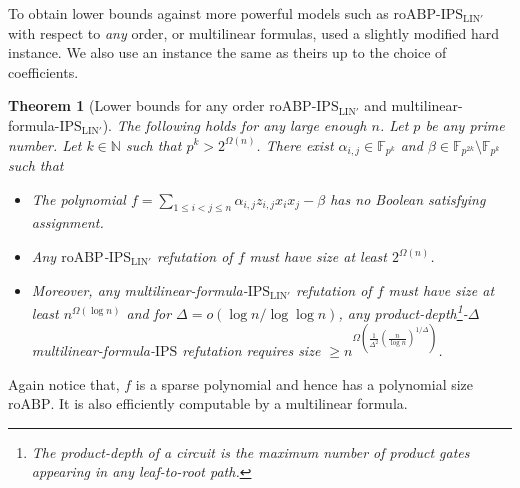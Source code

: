 \documentclass[11pt]{article}
\newtheorem{theorem}{Theorem}[section]
\newcommand{\F}{\mathbb{F}}
\newcommand{\comment}[2]{\marginpar{\tiny{\textbf{#1: }\textit{#2}}}}
\newcommand{\nl}[1]{\comment{NL}{#1}}
\newcommand{\vr}[1]{\comment{VR}{#1}}
\newcommand{\IPS}{\mathrm{IPS}}
\newcommand{\IPSLINp}{\mathrm{IPS}_{\mathrm{LIN}'}}
\newcommand{\roABP}{\mathrm{roABP}}
\begin{document}
To obtain lower bounds against more powerful models such as $\roABP$-$\IPSLINp$ with respect to \emph{any} order, or multilinear formulas, \cite{FSTW21} used a slightly modified hard instance. We also use an instance the same as theirs up to the choice of coefficients. 

\begin{theorem}
[Lower bounds for any order roABP-$\IPSLINp$ and multilinear-formula-$\IPSLINp$]
    \label{thm:lbd-roabp}
    The following holds for any large enough $n$. Let $p$ be any prime number. Let $k \in \mathbb{N}$ such that $p^k > 2^{\Omega(n)}$. There exist $\alpha_{i,j}\in \F_{p^k}$ and $\beta \in \F_{p^{2k}}\setminus \F_{p^k}$ such that 
    \begin{itemize}
        \item The polynomial $f = \sum_{1\leq i < j\leq n}\alpha_{i,j} z_{i,j} x_i x_j - \beta$ has no Boolean satisfying assignment.
        \item Any $\roABP$-$\IPSLINp$ refutation of $f$ must have size at least $2^{\Omega(n)}$.
        \item Moreover, any multilinear-formula-$\IPSLINp$ refutation of $f$ must have size at least $n^{\Omega(\log n)}$ and for $\Delta = o(\log n / \log \log n)$, any product-depth\footnote{The product-depth of a circuit is the maximum number of product gates appearing in any leaf-to-root path.}-$\Delta$ multilinear-formula-$\IPS$ refutation requires size $\geq n^{\Omega\left(\frac{1}{\Delta^2}(\frac{n}{\log n})^{1/\Delta}\right )}$. 
    \end{itemize}
\end{theorem}

Again notice that, $f$  is a sparse polynomial and hence has a polynomial size $\roABP$. It is also efficiently computable by a multilinear formula. 
\end{document}

